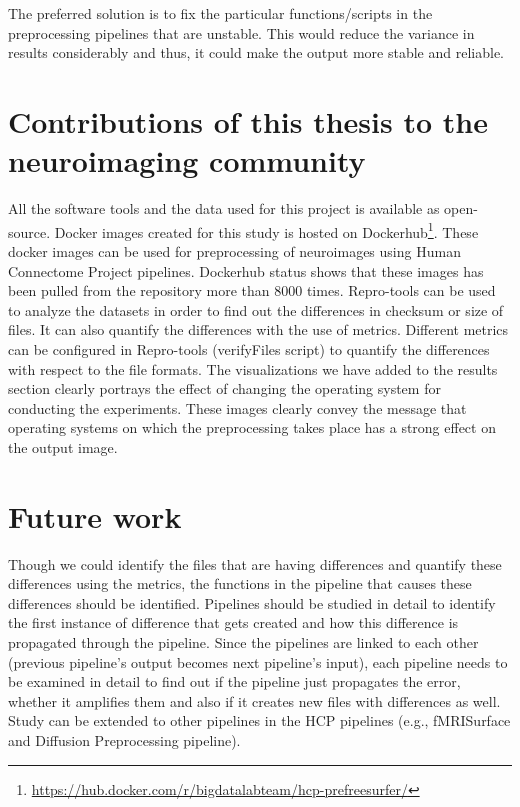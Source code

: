 The preferred solution is to fix the particular functions/scripts in the preprocessing pipelines that are unstable. This would reduce the variance in results considerably and thus, it could make the output more stable and reliable.

\section{Contributions of this thesis to the neuroimaging community}
All the software tools and the data used for this project is available as open-source. Docker images created for this study is hosted on Dockerhub\footnote{\url{https://hub.docker.com/r/bigdatalabteam/hcp-prefreesurfer/}}. These docker images can be used for preprocessing of neuroimages using Human Connectome Project pipelines. Dockerhub status shows that these images has been pulled from the repository more than 8000 times.
Repro-tools can be used to analyze the datasets in order to find out the differences in checksum or size of files. It can also quantify the differences with the use of metrics. Different metrics can be configured in Repro-tools (verifyFiles script) to quantify the differences with respect to the file formats.
The visualizations we have added to the results section clearly portrays the effect of changing the operating system for conducting the experiments. These images clearly convey the message that operating systems on which the preprocessing takes place has a strong effect on the output image.

\section{Future work}
Though we could identify the files that are having differences and quantify these differences using the metrics, the functions in the pipeline that causes these differences should be identified.
Pipelines should be studied in detail to identify the first instance of difference that gets created and how this difference is propagated through the pipeline.
Since the pipelines are linked to each other (previous pipeline's output becomes next pipeline's input), each pipeline needs to be examined in detail to find out if the pipeline just propagates the error, whether it amplifies them and also if it creates new files with differences as well. 
Study can be extended to other pipelines in the HCP pipelines (e.g., fMRISurface and Diffusion Preprocessing pipeline).

